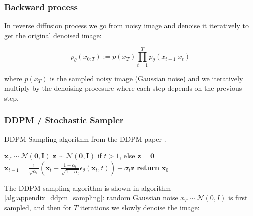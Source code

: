\subsubsection*{Backward process}

In reverse diffusion process we go from noisy image and denoise it iteratively to get the original denoised image:

\[ p_\theta (x_{0:T}) := p(x_T) \prod_{t=1}^{T} p_\theta (x_{t-1} | x_t) \]

where $p(x_T)$ is the sampled noisy image (Gaussian noise) and we iteratively multiply by the denoising procesure where each step depends on the previous step.









\subsubsection{DDPM / Stochastic Sampler}





\begin{algorithm}
    \caption{DDPM Sampling algorithm from the DDPM paper \cite{ddpm}.}
    \label{alg:appendix_ddpm_sampling}
    \begin{algorithmic}[1]
        \State $\mathbf{x}_T \sim \mathcal{N}(\mathbf{0}, \mathbf{I})$
            \State $\mathbf{z} \sim \mathcal{N}(\mathbf{0}, \mathbf{I})$ if $t > 1$, else $\mathbf{z} = \mathbf{0}$
            \State $\mathbf{x}_{t-1} = \frac{1}{\sqrt{\alpha_t}} \left( \mathbf{x}_t - \frac{1 - \alpha_t}{\sqrt{1 - \bar{\alpha}_t}} {\epsilon}_{\theta} (\mathbf{x}_t, t) \right) + \sigma_t \mathbf{z}$
        \EndFor
        \State \textbf{return} $\mathbf{x}_0$
    \end{algorithmic}
\end{algorithm}






The DDPM sampling algorithm is shown in algorithm \ref{alg:appendix_ddpm_sampling}: random Gaussian noise $x_T \sim \mathcal{N} (0, I)$ is first sampled, and then for $T$ iterations we slowly denoise the image:

